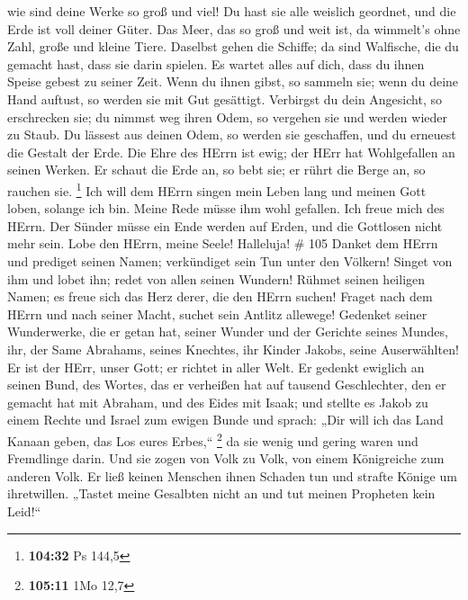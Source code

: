 wie sind deine Werke so groß und viel! Du hast sie alle weislich
geordnet, und die Erde ist voll deiner Güter.  Das Meer,
das so groß und weit ist, da wimmelt's ohne Zahl, große und kleine
Tiere.  Daselbst gehen die Schiffe; da sind Walfische, die
du gemacht hast, dass sie darin spielen.  Es wartet alles
auf dich, dass du ihnen Speise gebest zu seiner Zeit.  Wenn
du ihnen gibst, so sammeln sie; wenn du deine Hand auftust, so werden
sie mit Gut gesättigt.  Verbirgst du dein Angesicht, so
erschrecken sie; du nimmst weg ihren Odem, so vergehen sie und werden
wieder zu Staub.  Du lässest aus deinen Odem, so werden sie
geschaffen, und du erneuest die Gestalt der Erde.  Die Ehre
des HErrn ist ewig; der HErr hat Wohlgefallen an seinen Werken.
 Er schaut die Erde an, so bebt sie; er rührt die Berge an,
so rauchen sie. \footnote{\textbf{104:32} Ps 144,5}  Ich
will dem HErrn singen mein Leben lang und meinen Gott loben, solange ich
bin.  Meine Rede müsse ihm wohl gefallen. Ich freue mich
des HErrn.  Der Sünder müsse ein Ende werden auf Erden, und
die Gottlosen nicht mehr sein. Lobe den HErrn, meine Seele! Halleluja!
\# 105  Danket dem HErrn und prediget seinen Namen;
verkündiget sein Tun unter den Völkern!  Singet von ihm und
lobet ihn; redet von allen seinen Wundern!  Rühmet seinen
heiligen Namen; es freue sich das Herz derer, die den HErrn suchen!
 Fraget nach dem HErrn und nach seiner Macht, suchet sein
Antlitz allewege!  Gedenket seiner Wunderwerke, die er getan
hat, seiner Wunder und der Gerichte seines Mundes,  ihr, der
Same Abrahams, seines Knechtes, ihr Kinder Jakobs, seine Auserwählten!
 Er ist der HErr, unser Gott; er richtet in aller Welt.
 Er gedenkt ewiglich an seinen Bund, des Wortes, das er
verheißen hat auf tausend Geschlechter,  den er gemacht hat
mit Abraham, und des Eides mit Isaak;  und stellte es Jakob
zu einem Rechte und Israel zum ewigen Bunde  und sprach:
„Dir will ich das Land Kanaan geben, das Los eures Erbes,`` \footnote{\textbf{105:11}
  1Mo 12,7}  da sie wenig und gering waren und Fremdlinge
darin.  Und sie zogen von Volk zu Volk, von einem
Königreiche zum anderen Volk.  Er ließ keinen Menschen
ihnen Schaden tun und strafte Könige um ihretwillen. 
„Tastet meine Gesalbten nicht an und tut meinen Propheten kein Leid!{}``
